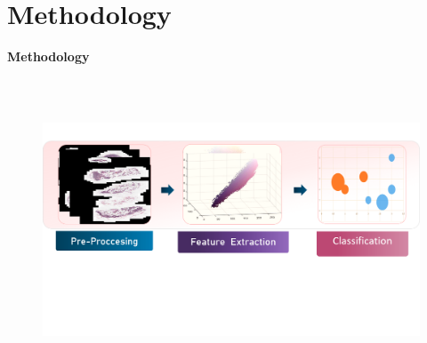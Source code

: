 \documentclass[usenames,dvipsnames]{beamer}
\begin{document}
\section{\large Methodology}
\begin{frame}{\textbf{Methodology}}
\vspace{-0.7cm}
\begin{figure}
    \centering
   \includegraphics[height=9cm,width=14cm]{imagenes3/metodologia1.png}
  
\end{figure}
  

\end{frame}
\end{document}
